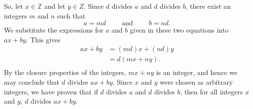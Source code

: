 \documentclass[11pt]{article}
\begin{document}
\begin{enumerate}
\begin{myproof}
So, let  $x \in \mathbb{Z}$ and let  $y \in Z$.  Since  $d$  divides  $a$ and $d$ divides $b$, there exist an integers  $m$ and $n$  such that
\[
a = md \qquad \text{ and } \qquad b = nd.
\]
We substitute the expressions for  $a$  and  $b$  given in these two equations into  $ax + by$.  This gives
\[
\begin{aligned}
  ax + by &= \left( {md} \right)x + \left( {nd} \right)y \\ 
          &= d\left( {mx + ny} \right). \\ 
\end{aligned} 
\]
By the closure properties of the integers,  $mx + ny$ is an integer, and hence we may conclude that  $d$  divides  $ax + by$.  Since  $x$  and  $y$  were chosen as arbitrary integers, we have proven that if  $d$  divides  $a$  and  $d$  divides  $b$, then for all integers  $x$  and  $y$,  $d$  divides  $ax + by$.
\end{myproof}

\end{enumerate}
\end{document}
